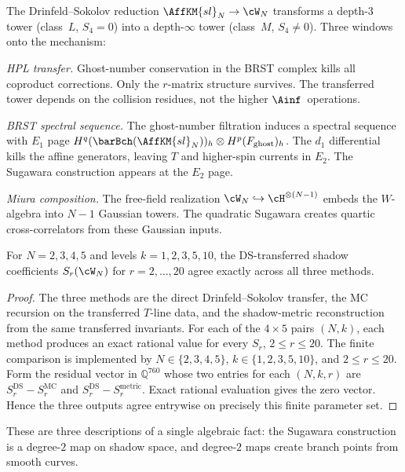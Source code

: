 The Drinfeld--Sokolov reduction $\AffKM{sl}_N \to \cW_N$
transforms a depth-$3$ tower (class~$L$, $S_4 = 0$) into a
depth-$\infty$ tower (class~$M$, $S_4 \neq 0$). Three windows
onto the mechanism:

\emph{HPL transfer.} Ghost-number conservation in the BRST
complex kills all coproduct corrections. Only the $r$-matrix
structure survives. The transferred tower depends on the collision
residues, not the higher $\Ainf$~operations.

\emph{BRST spectral sequence.} The ghost-number filtration
induces a spectral sequence with $E_1$ page
$H^q(\barBch(\AffKM{sl}_N))_h \otimes H^p(F_{\mathrm{ghost}})_h$.
The $d_1$ differential kills the affine generators, leaving
$T$ and higher-spin currents in $E_2$. The Sugawara
construction appears at the $E_2$ page.

\emph{Miura composition.} The free-field realization
$\cW_N \hookrightarrow \cH^{\otimes(N-1)}$ embeds the
$W$-algebra into $N - 1$ Gaussian towers. The quadratic
Sugawara creates quartic cross-correlators from these Gaussian
inputs.

\begin{theorem}
\label{thm:comp-ds-consistency}
\ClaimStatusProvedHere
For $N = 2, 3, 4, 5$ and levels $k = 1, 2, 3, 5, 10$,
the DS-transferred shadow coefficients $S_r(\cW_N)$ for
$r = 2, \ldots, 20$ agree exactly across all three
methods.
\end{theorem}

\begin{proof}
The three methods are the direct Drinfeld--Sokolov transfer, the MC
recursion on the transferred $T$-line data, and the shadow-metric
reconstruction from the same transferred invariants.  For each of the
$4\times5$ pairs $(N,k)$, each method produces an exact rational value
for every $S_r$, $2\le r\le20$.  The finite comparison is implemented by
$N\in\{2,3,4,5\}$, $k\in\{1,2,3,5,10\}$, and $2\le r\le20$.
Form the residual vector in $\mathbb Q^{760}$ whose two entries for
each $(N,k,r)$ are
$S_r^{\mathrm{DS}}-S_r^{\mathrm{MC}}$ and
$S_r^{\mathrm{DS}}-S_r^{\mathrm{metric}}$.  Exact rational
evaluation gives the zero vector.  Hence the three outputs agree
entrywise on precisely this finite parameter set.
\end{proof}

These are three descriptions of a single algebraic fact: the
Sugawara construction is a degree-$2$ map on shadow space, and
degree-$2$ maps create branch points from smooth curves.

